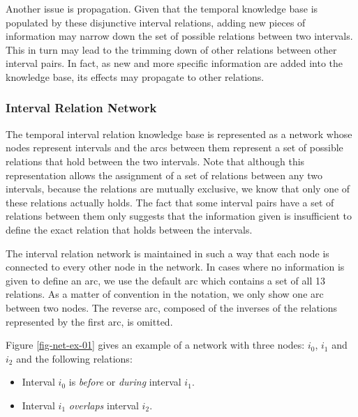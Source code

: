 \documentclass[11pt]{report}
\begin{document}
        Another issue is propagation. Given that the temporal knowledge base
        is populated by these disjunctive interval relations, adding new
        pieces of information may narrow down the set of possible relations
        between two intervals. This in turn may lead to the trimming down of
        other relations between other interval pairs. In fact, as new and more
        specific information are added into the knowledge base, its effects may
        propagate to other relations.

        \subsubsection{Interval Relation Network}

          The temporal interval relation knowledge base is represented as a network
          whose nodes represent intervals and the arcs between them represent a set
          of possible relations that hold between the two intervals. Note that although
          this representation allows the assignment of a set of relations between any
          two intervals, because the relations are mutually exclusive, we know that
          only one of these relations actually holds. The fact that some interval
          pairs have a set of relations between them only suggests that the information
          given is insufficient to define the exact relation that holds between the
          intervals.

          The interval relation network is maintained in such a way that each node
          is connected to every other node in the network. In cases where no
          information is given to define an arc, we use the default arc which contains
          a set of all 13 relations. As a matter of convention in the notation, we only
          show one arc between two nodes. The reverse arc, composed of the inverses of
          the relations represented by the first arc, is omitted.

          Figure \ref{fig-net-ex-01} gives an example of a network with three nodes:
          $i_0$, $i_1$ and $i_2$ and the following relations:

          \begin{itemize}
            \item Interval ${i_0}$ is {\em before} or {\em during} interval ${i_1}$.
            \item Interval ${i_1}$ {\em overlaps} interval $i_2$.
          \end{itemize}
\end{document}
